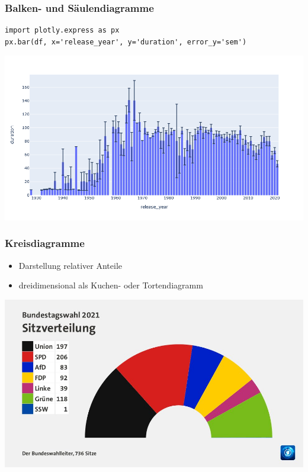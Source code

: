 \begin{frame}[fragile]
\frametitle{Balken- und Säulendiagramme}

\begin{verbatim}
import plotly.express as px
px.bar(df, x='release_year', y='duration', error_y='sem')
\end{verbatim}

\vspace{-\baselineskip}

\begin{center}
\includegraphics[width=0.85\linewidth]{fig5/bar5.png}
\end{center}
\end{frame}


\begin{frame}
\frametitle{Kreisdiagramme}

\begin{itemize}
\item Darstellung relativer Anteile
\item dreidimensional als Kuchen- oder Tortendiagramm
\end{itemize}

\begin{center}
\includegraphics[width=0.85\linewidth]{fig5/pie1.jpg}
\end{center}
\end{frame}



